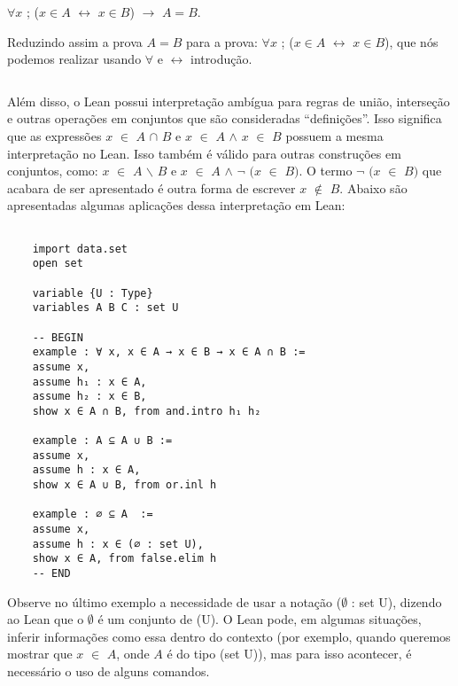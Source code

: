 $\qquad$

\begin{center}
    $\forall x$ ; ($x \in A$ $\leftrightarrow$ $x \in B$) $\rightarrow$ $A = B$.  
\end{center}

Reduzindo assim a prova $A = B$ para a prova: $\forall x$ ; ($x \in A$ $\leftrightarrow$ $x \in B$), que nós podemos realizar usando $\forall$ e $\leftrightarrow$ introdução.

$\qquad$

Além disso, o Lean possui interpretação ambígua para regras de união, interseção e outras operações em conjuntos que são consideradas “definições”. Isso significa que as expressões $x$ $\in$ $A$ $\cap$ $B$ e $x$ $\in$ $A$ $\wedge$ $x$ $\in$ $B$ possuem a mesma interpretação no Lean. Isso também é válido para outras construções em conjuntos, como: $x$ $\in$ $A$ $\backslash $ $B$ e $x$ $\in$ $A$ $\wedge$ $\neg$ $(x$ $\in$ $B)$. O termo $\neg$ $(x$ $\in$ $B)$ que acabara de ser apresentado é outra forma de escrever $x$ $\notin$ $B$. Abaixo são apresentadas algumas aplicações dessa interpretação em Lean:

\begin{lstlisting}

    import data.set
    open set

    variable {U : Type}
    variables A B C : set U

    -- BEGIN
    example : ∀ x, x ∈ A → x ∈ B → x ∈ A ∩ B :=
    assume x,
    assume h₁ : x ∈ A,
    assume h₂ : x ∈ B,
    show x ∈ A ∩ B, from and.intro h₁ h₂

    example : A ⊆ A ∪ B :=
    assume x,
    assume h : x ∈ A,
    show x ∈ A ∪ B, from or.inl h

    example : ∅ ⊆ A  :=
    assume x,
    assume h : x ∈ (∅ : set U),
    show x ∈ A, from false.elim h
    -- END

\end{lstlisting}

Observe no último exemplo a necessidade de usar a notação {
\selectfont ($\emptyset$ : set U)}, dizendo ao Lean que o $\emptyset$ é um conjunto de {
\selectfont (U)}. O Lean pode, em algumas situações, inferir informações como essa dentro do contexto (por exemplo, quando queremos mostrar que $x$ $\in$ $A$, onde $A$ é do tipo {
\selectfont (set U)}), mas para isso acontecer, é necessário o uso de alguns comandos.

